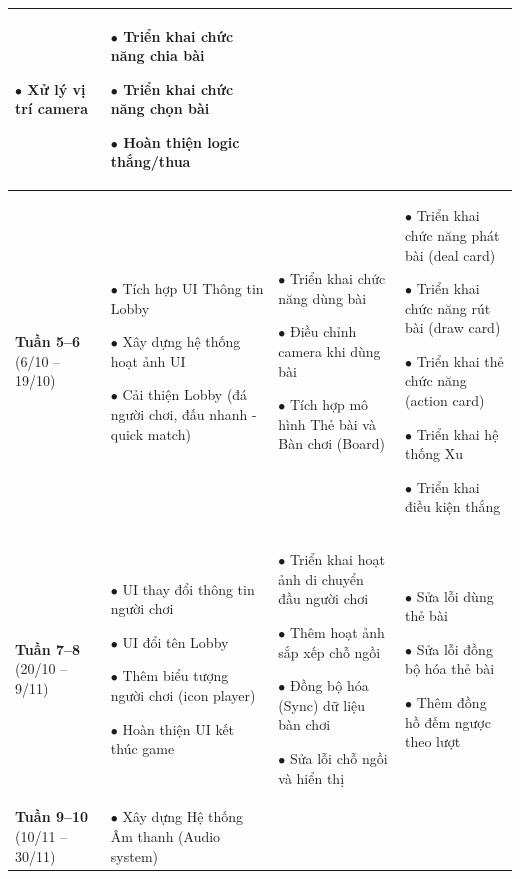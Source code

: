 \begin{longtable}{|p{2cm}|p{4cm}|p{4cm}|p{4cm}|}
    $\bullet$ Xử lý vị trí camera
&
    $\bullet$ Triển khai chức năng chia bài
    
    $\bullet$ Triển khai chức năng chọn bài
    
    $\bullet$ Hoàn thiện logic thắng/thua
\\
\hline

\textbf{Tuần 5--6} \newline (6/10 -- 19/10)
&
    $\bullet$ Tích hợp UI Thông tin Lobby
    
    $\bullet$ Xây dựng hệ thống hoạt ảnh UI
    
    $\bullet$ Cải thiện Lobby (đá người chơi, đấu nhanh - quick match)
&
    $\bullet$ Triển khai chức năng dùng bài
    
    $\bullet$ Điều chỉnh camera khi dùng bài
    
    $\bullet$ Tích hợp mô hình Thẻ bài và Bàn chơi (Board)
&
    $\bullet$ Triển khai chức năng phát bài (deal card)
    
    $\bullet$ Triển khai chức năng rút bài (draw card)
    
    $\bullet$ Triển khai thẻ chức năng (action card)
    
    $\bullet$ Triển khai hệ thống Xu
    
    $\bullet$ Triển khai điều kiện thắng
\\
\hline

\textbf{Tuần 7--8} \newline (20/10 -- 9/11)
&
    $\bullet$ UI thay đổi thông tin người chơi
    
    $\bullet$ UI đổi tên Lobby
    
    $\bullet$ Thêm biểu tượng người chơi (icon player)
    
    $\bullet$ Hoàn thiện UI kết thúc game
&
    $\bullet$ Triển khai hoạt ảnh di chuyển đầu người chơi
    
    $\bullet$ Thêm hoạt ảnh sắp xếp chỗ ngồi 
    
    $\bullet$ Đồng bộ hóa (Sync) dữ liệu bàn chơi
    
    $\bullet$ Sửa lỗi chỗ ngồi và hiển thị
&    
    $\bullet$ Sửa lỗi dùng thẻ bài
    
    $\bullet$ Sửa lỗi đồng bộ hóa thẻ bài
    
    $\bullet$ Thêm đồng hồ đếm ngược theo lượt
\\
\hline

\textbf{Tuần 9--10} \newline (10/11 -- 30/11)
&
    $\bullet$ Xây dựng Hệ thống Âm thanh (Audio system)
    

\end{longtable}

